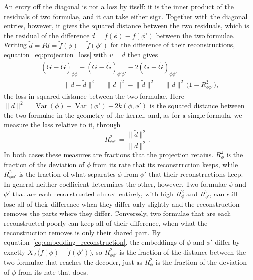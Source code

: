 \documentclass[titlepage,a4paper,11pt]{report}
\begin{document}
    An entry off the diagonal is not a loss by itself: it is the inner product of the residuals of two formulae, and it can take either sign. Together with the diagonal entries, however, it gives the squared distance between the two residuals, which is the residual of the difference $d=f(\phi)-f(\phi')$ between the two formulae. Writing $\tilde d=Pd=\tilde f(\phi)-\tilde f(\phi')$ for the difference of their reconstructions, equation~\eqref{eq:projection_loss} with $v=d$ then gives
    \begin{equation}\label{eq:pair_error}
        \begin{split}
            &(G-\tilde G)_{\phi\phi}+(G-\tilde G)_{\phi'\phi'}-2(G-\tilde G)_{\phi\phi'}\\
            &\qquad=\lVert d-\tilde d\rVert^2
            =\lVert d\rVert^2-\lVert\tilde d\rVert^2
            =\lVert d\rVert^2\,\bigl(1-R^2_{\phi\phi'}\bigr),
        \end{split}
    \end{equation}
    the loss in squared distance between the two formulae. Here $\lVert d\rVert^2=\operatorname{Var}(\phi)+\operatorname{Var}(\phi')-2k(\phi,\phi')$ is the squared distance between the two formulae in the geometry of the kernel, and, as for a single formula, we measure the loss relative to it, through
    \begin{equation}\label{eq:pair_retention}
        R^2_{\phi\phi'}=\frac{\lVert\tilde d\rVert^2}{\lVert d\rVert^2}.
    \end{equation}
    In both cases these measures are fractions that the projection retains. $R^2_\phi$ is the fraction of the deviation of $\phi$ from its rate that its reconstruction keeps, while $R^2_{\phi\phi'}$ is the fraction of what separates $\phi$ from $\phi'$ that their reconstructions keep. In general neither coefficient determines the other, however. Two formulae $\phi$ and $\phi '$ that are each reconstructed almost entirely, with high $R^2_\phi$ and $R^2_{\phi'}$, can still lose all of their difference when they differ only slightly and the reconstruction removes the parts where they differ. Conversely, two formulae that are each reconstructed poorly can keep all of their difference, when what the reconstruction removes is only their shared part. By equation~\eqref{eq:embedding_reconstruction}, the embeddings of $\phi$ and $\phi'$ differ by exactly $X_A\bigl(\tilde f(\phi)-\tilde f(\phi')\bigr)$, so $R^2_{\phi\phi'}$ is the fraction of the distance between the two formulae that reaches the decoder, just as $R^2_\phi$ is the fraction of the deviation of $\phi$ from its rate that does.
\end{document}

